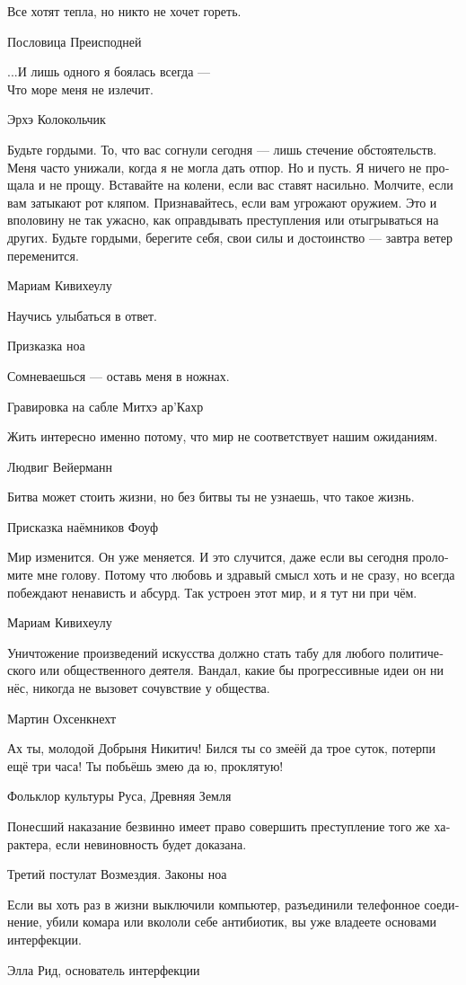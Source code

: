 \documentclass[a4paper,12pt,fleqn]{book}\usepackage{polyglossia}\setdefaultlanguage[babelshorthands=true]{russian}\setotherlanguage{english}\defaultfontfeatures{Ligatures=TeX,Mapping=tex-text}\usepackage{xcolor}\newcommand{\ml}[3]{#2}
\begin{document}
{\epigraph
{Все хотят тепла, но никто не хочет гореть.}
{Пословица Преисподней}

\epigraph
{...И лишь одного я боялась всегда ---\\
Что море меня не излечит.}
{Эрхэ Колокольчик}

\epigraph
{Будьте гордыми.
То, что вас согнули сегодня --- лишь стечение обстоятельств.
Меня часто унижали, когда я не могла дать отпор.
Но и пусть.
Я ничего не прощала и не прощу.
Вставайте на колени, если вас ставят насильно.
Молчите, если вам затыкают рот кляпом.
Признавайтесь, если вам угрожают оружием.
Это и вполовину не так ужасно, как оправдывать преступления или отыгрываться на других.
Будьте гордыми, берегите себя, свои силы и достоинство --- завтра ветер переменится.}
{Мариам Кивихеулу}

\epigraph{
\ml{$0$}
{Научись улыбаться в ответ.}
{Learn to smile back.}
}{Призказка ноа}

\epigraph
{\ml{$0$}
{Сомневаешься --- оставь меня в ножнах.}
{If in doubt, keep me untouched.}}
{Гравировка на сабле Митхэ ар'Кахр}

\epigraph
{Жить интересно именно потому, что мир не соответствует нашим ожиданиям.}
{Людвиг Вейерманн}

\epigraph{
\ml{$0$}
{Битва может стоить жизни, но без битвы ты не узнаешь, что такое жизнь.}
{Battle may take your life, but escaping battle you'll never know what life is.}
}{Присказка наёмников Фоуф}

\epigraph
{Мир изменится.
Он уже меняется.
И это случится, даже если вы сегодня проломите мне голову.
Потому что любовь и здравый смысл хоть и не сразу, но всегда побеждают ненависть и абсурд.
Так устроен этот мир, и я тут ни при чём.}
{Мариам Кивихеулу}

\epigraph
{Уничтожение произведений искусства должно стать табу для любого политического или общественного деятеля.
Вандал, какие бы прогрессивные идеи он ни нёс, никогда не вызовет сочувствие у общества.}
{Мартин Охсенкнехт}

\epigraph
{Ах ты, молодой Добрыня Никитич!
Бился ты со змеёй да трое суток, потерпи ещё три часа!
Ты побьёшь змею да ю, проклятую!}
{Фольклор культуры Руса, Древняя Земля}

\epigraph
{Понесший наказание безвинно имеет право совершить преступление того же характера, если невиновность будет доказана.}
{Третий постулат Возмездия.
Законы ноа}

\epigraph
{Если вы хоть раз в жизни выключили компьютер, разъединили телефонное соединение, убили комара или вкололи себе антибиотик, вы уже владеете основами интерфекции.}
{Элла Рид, основатель интерфекции}

}
\end{document}
